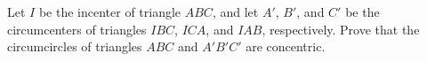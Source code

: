 Let $I$ be the incenter of triangle $ABC$,  and let $A'$,  $B'$,  and $C'$ be the circumcenters of triangles $IBC$,  $ICA$,  and $IAB$,  respectively.  Prove that the circumcircles of triangles $ABC$ and $A'B'C'$ are concentric.